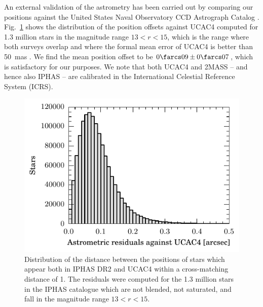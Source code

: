 \documentclass[a4paper,useAMS,usenatbib]{mn2e}
\begin{document}
{An external validation of the astrometry 
has been carried out by comparing our positions against the
United States Naval Observatory CCD Astrograph Catalog 
\citep[UCAC4;][]{UCAC4}.
Fig.~\ref{fig:astrometry} shows the distribution
of the position offsets against UCAC4
computed for 1.3 million stars
in the magnitude range $13 < r < 15$,
which is the range where both surveys overlap
and where the formal mean error of UCAC4
is better than 50~mas \citep{UCAC3}.
We find the mean position offset to be $0\farcs 09\pm0\farcs 07$,
which is satisfactory for our purposes.
We note that both UCAC4 and 2MASS -- and hence also IPHAS --
are calibrated in the International Celestial Reference System (ICRS).

\begin{figure}
    \includegraphics[width=\linewidth]{figures/astrometry/astrometry.pdf} 
    \caption{Distribution of the distance
    		between the positions of stars
    		which appear both in IPHAS DR2 and UCAC4
    		within a cross-matching distance of 1\arcsec.
            The residuals were computed for 
            the 1.3 million stars in the IPHAS catalogue
            which are not blended, not saturated,
            and fall in the magnitude range $13 < r < 15$.}
    \label{fig:astrometry}
\end{figure}




}
\end{document}
